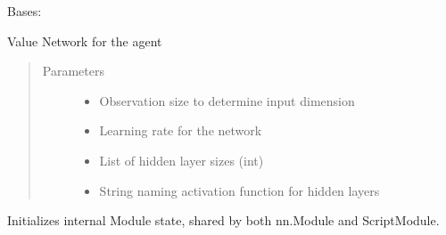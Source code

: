 \documentclass[letterpaper,10pt,english]{sphinxmanual}
\begin{document}
\begin{fulllineitems}
\label{\detokenize{agents.reinforcement_learning:agents.reinforcement_learning.ppo.ValueNetwork}}
\sphinxAtStartPar
Bases: 

\sphinxAtStartPar
Value Network for the agent
\begin{quote}\begin{description}
\item[{Parameters}] \leavevmode\begin{itemize}
\item {} 
\sphinxAtStartPar
{} \textendash{} Observation size to determine input dimension

\item {} 
\sphinxAtStartPar
{} \textendash{} Learning rate for the network

\item {} 
\sphinxAtStartPar
{} \textendash{} List of hidden layer sizes (int)

\item {} 
\sphinxAtStartPar
{} \textendash{} String naming activation function for hidden layers

\end{itemize}

\end{description}\end{quote}

\begin{fulllineitems}
\label{\detokenize{agents.reinforcement_learning:agents.reinforcement_learning.ppo.ValueNetwork.__init__}}
\sphinxAtStartPar
Initializes internal Module state, shared by both nn.Module and ScriptModule.


\end{fulllineitems}
\end{fulllineitems}
\end{document}
